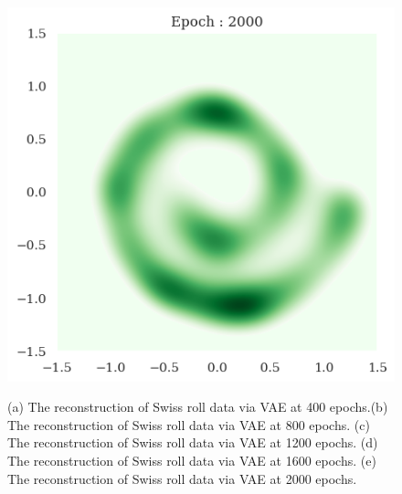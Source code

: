 \documentclass[10pt]{article}
\begin{document}
\begin{figure}[!h]
\begin{center}
{            \includegraphics[scale = 0.2]{fig2-5.png}
        }
        \caption{(a) The reconstruction of Swiss roll data via VAE at 400 epochs.(b) The reconstruction of Swiss roll data via VAE at 800 epochs. (c) The reconstruction of Swiss roll data via VAE at 1200 epochs. (d) The reconstruction of Swiss roll data via VAE at 1600 epochs. (e) The reconstruction of Swiss roll data via VAE at 2000 epochs.}
        \label{fig2}
    \end{center}
\end{figure}
\end{document}
